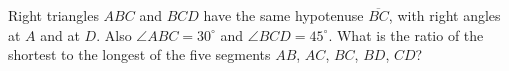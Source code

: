 Right triangles $ABC$ and $BCD$ have the same hypotenuse $\overline{BC}$, with right angles at $A$ and at $D$. Also $\angle ABC=30^\circ$ and $\angle BCD=45^\circ$. What is the ratio of the shortest to the longest of the five segments $AB$, $AC$, $BC$, $BD$, $CD$?
